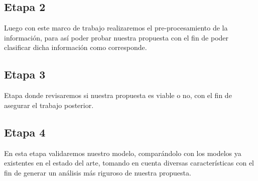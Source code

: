 \documentclass[a4paper,12pt]{article}
\begin{document}
\subsection{Etapa 2}
Luego con este marco de trabajo realizaremos el pre-procesamiento de la información, para así poder probar nuestra propuesta con el fin de poder clasificar dicha información como corresponde.
\subsection{Etapa 3}
Etapa donde revisaremos si nuestra propuesta es viable o no, con el fin de asegurar el trabajo posterior.
\subsection{Etapa 4}
En esta etapa validaremos nuestro modelo, comparándolo con los modelos ya existentes en el estado del arte, tomando en cuenta diversas características con el fin de generar un análisis más riguroso de nuestra propuesta.


\end{document}
